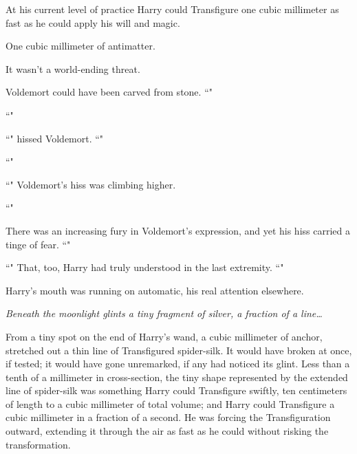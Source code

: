 At his current level of practice Harry could Transfigure one cubic millimeter as fast as he could apply his will and magic.

One cubic millimeter of antimatter.

It wasn't a world-ending threat.

Voldemort could have been carved from stone. ``"

``"

``" hissed Voldemort. ``"

``"

``" Voldemort's hiss was climbing higher.

``"

There was an increasing fury in Voldemort's expression, and yet his hiss carried a tinge of fear. ``"

``" That, too, Harry had truly understood in the last extremity. ``"

Harry's mouth was running on automatic, his real attention elsewhere.

\emph{Beneath the moonlight glints a tiny fragment of silver, a fraction of a line{\ldots}}

From a tiny spot on the end of Harry's wand, a cubic millimeter of anchor, stretched out a thin line of Transfigured spider-silk. It would have broken at once, if tested; it would have gone unremarked, if any had noticed its glint. Less than a tenth of a millimeter in cross-section, the tiny shape represented by the extended line of spider-silk was something Harry could Transfigure swiftly, ten centimeters of length to a cubic millimeter of total volume; and Harry could Transfigure a cubic millimeter in a fraction of a second. He was forcing the Transfiguration outward, extending it through the air as fast as he could without risking the transformation.

